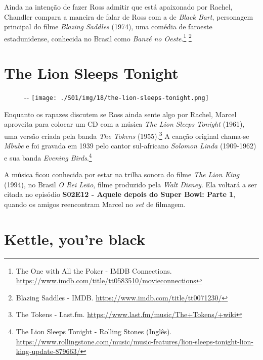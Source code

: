 Ainda na intenção de fazer Ross admitir que está apaixonado por Rachel,
Chandler compara a maneira de falar de Ross com a de \emph{Black Bart},
personagem principal do filme \emph{Blazing Saddles} (1974), uma comédia
de faroeste estadunidense, conhecida no Brasil como \emph{Banzé no
Oeste}.\footnote{\sloppy The One with All the Poker - IMDB Connections. \url{https://www.imdb.com/title/tt0583510/movieconnections}}
\footnote{\sloppy Blazing Saddles - IMDB. \url{https://www.imdb.com/title/tt0071230/}}

\hypertarget{the-lion-sleeps-tonight}{%
\section{The Lion Sleeps Tonight}\label{the-lion-sleeps-tonight}}

\begin{figure}[!ht]
  \begin{adjustwidth}{-\oddsidemargin-1in}{-\rightmargin}
    \centering
    \texttt{[image: ./S01/img/18/the-lion-sleeps-tonight.png]}
  \end{adjustwidth}
\end{figure}

Enquanto os rapazes discutem se Ross ainda sente algo por Rachel, Marcel
aproveita para colocar um CD com a música \emph{The Lion Sleeps Tonight}
(1961), uma versão criada pela banda \emph{The Tokens}
(1955).\footnote{\sloppy The Tokens - Last.fm. \url{https://www.last.fm/music/The+Tokens/+wiki}}
A canção original chama-se \emph{Mbube} e foi gravada em 1939 pelo
cantor sul-africano \emph{Solomon Linda} (1909-1962) e sua banda
\emph{Evening Birds}.\footnote{\sloppy The Lion Sleeps Tonight - Rolling Stones (Inglês). \url{https://www.rollingstone.com/music/music-features/lion-sleeps-tonight-lion-king-update-879663/}}

A música ficou conhecida por estar na trilha sonora do filme \emph{The
Lion King} (1994), no Brasil \emph{O Rei Leão}, filme produzido pela
\emph{Walt Disney}. Ela voltará a ser citada no episódio
\textbf{\textcolor{primarycolor}{S02E12 - Aquele depois do Super Bowl: Parte 1}},
quando os amigos reencontram Marcel no \emph{set} de filmagem.

\hypertarget{kettle-youre-black}{%
\section{Kettle, you're black}\label{kettle-youre-black}}

